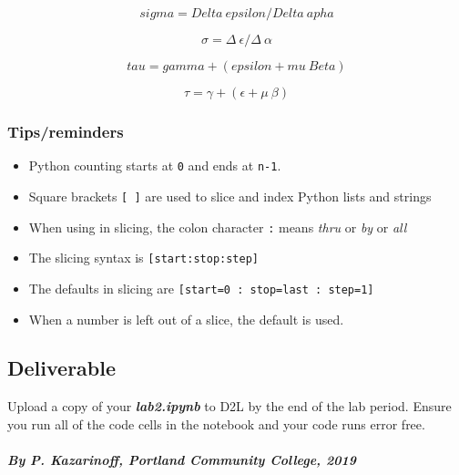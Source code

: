 \documentclass[11pt]{article}
\begin{document}
\[ sigma = Delta \ epsilon / Delta \ apha \]

\[ \sigma = \Delta \ \epsilon / \Delta \ \alpha \]

\[ tau = gamma + (epsilon + mu \ Beta) \]

\[ \tau = \gamma + (\epsilon + \mu \ \beta) \]

    \hypertarget{tipsreminders}{%
\subsubsection{Tips/reminders}\label{tipsreminders}}

\begin{itemize}
\item
  Python counting starts at \texttt{0} and ends at \texttt{n-1}.
\item
  Square brackets \texttt{{[}\ {]}} are used to slice and index Python
  lists and strings
\item
  When using in slicing, the colon character \texttt{:} means
  \emph{thru} or \emph{by} or \emph{all}
\item
  The slicing syntax is \texttt{{[}start:stop:step{]}}
\item
  The defaults in slicing are
  \texttt{{[}start=0\ :\ stop=last\ :\ step=1{]}}
\item
  When a number is left out of a slice, the default is used.
\end{itemize}

    \hypertarget{deliverable}{%
\subsection{Deliverable}\label{deliverable}}

Upload a copy of your \textbf{\emph{lab2.ipynb}} to D2L by the end of
the lab period. Ensure you run all of the code cells in the notebook and
your code runs error free.

    \hypertarget{by-p.-kazarinoff-portland-community-college-2019}{%
\paragraph{\texorpdfstring{\emph{By P. Kazarinoff, Portland Community
College,
2019}}{By P. Kazarinoff, Portland Community College, 2019}}\label{by-p.-kazarinoff-portland-community-college-2019}}


    
    
    
    
\end{document}
